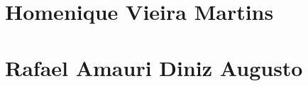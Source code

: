 \begin{apendicesenv}
      
    \partapendices

    \setcounter{chapter}{0}
    \renewcommand{\thechapter}{\Alph{chapter}}%
    
    \chapter{Homenique Vieira Martins}



    \newpage


       
    \newpage
    \chapter{Rafael Amauri Diniz Augusto}





    
    \newpage
    


\end{apendicesenv}